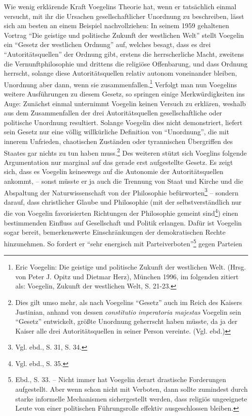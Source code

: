 Wie wenig erklärende Kraft Voegelins Theorie hat, wenn er tatsächlich einmal
versucht, mit ihr die Ursachen gesellschaftlicher Unordnung zu beschreiben,
lässt sich am besten an einem Beispiel nachvollziehen: In seinem 1959
gehaltenen Vortrag "`Die geistige und politische Zukunft der westlichen Welt"'
stellt Voegelin ein "`Gesetz der westlichen Ordnung"' auf, welches besagt,
dass es drei "`Autoritätsquellen"' der Ordnung gibt, erstens die
herrscherliche Macht, zweitens die Vernunftphilosophie und drittens die
religiöse Offenbarung, und dass Ordnung herrscht, solange diese
Autoritätsquellen relativ autonom voneinander bleiben, Unordnung aber dann,
wenn sie zusammenfallen.\footnote{ Eric Voegelin: Die geistige und politische
  Zukunft der westlichen Welt. (Hrsg. von Peter J. Opitz und Dietmar Herz),
  München 1996, im folgenden zitiert als: Voegelin, Zukunft der westlichen
  Welt, S. 21-23.} Verfolgt man nun Voegelins weitere Ausführungen zu diesem
Gesetz, so springen einige Merkwürdigkeiten ins Auge: Zunächst einmal
unternimmt Voegelin keinen Versuch zu erklären, weshalb aus dem Zusammenfallen
der drei Autoritätsquellen gesellschaftliche oder politische Unordnung
resultiert. Solange Voegelin dies nicht demonstriert, liefert sein Gesetz nur
eine völlig willkürliche Definition von "`Unordnung"', die mit innerem
Unfrieden, chaotischen Zuständen oder tyrannischen Übergriffen des Staates gar
nichts zu tun haben muss.\footnote{Dies gilt umso mehr, als nach Voegelins
  "`Gesetz"' auch im Reich des Kaisers Justinian, anhand von dessen {\it
    constitutio imperatoria majestas} Voegelin sein "`Gesetz"' entwickelt,
  größte Unordnung geherrscht haben müsste, da ja der Kaiser alle drei
  Autoritätsquellen in seiner Person vereinte. (Vgl. ebd.)} Des weiteren stützt
sich Voeglins folgende Argumentation nur marginal auf das gerade erst
aufgestellte Gesetz. Es zeigt sich, dass es Voegelin keineswegs auf die
Autonomie der Autoritätsquellen ankommt, -- sonst müsste er ja auch die
Trennung von Staat und Kirche und die Abspaltung der Naturwissenschaft von der
Philosophie befürworten\footnote{Vgl. ebd., S. 31, S. 34.} -- sondern darauf,
dass christlicher Glaube und Philosophie (mit der selbstverständlich nur die
von Voegelin favorisierten Richtungen der Philosophie gemeint
sind\footnote{Vgl.  ebd., S. 35.}) einen bestimmenden Einfluss auf Gesellschaft
und Politik erlangen. Dafür ist Voegelin sogar bereit, bemerkenswerte
Einschränkungen der demokratischen Rechte hinzunehmen.  So fordert er "`sehr
energisch mit Parteiverboten"'\footnote{Ebd., S. 33. -- Nicht immer hat
  Voegelin derart drastische Forderungen aufgestellt. Aber wenn schon nicht
  mit Verboten, dann sollte zumindest durch starke informelle Mechanismen
  sichergestellt werden, dass religiös ungeeignete Leute von einer politischen
  Führungsrolle effektiv ausgeschlossen bleiben.}  gegen Parteien
